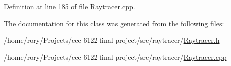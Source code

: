Definition at line 185 of file Raytracer.\+cpp.



The documentation for this class was generated from the following files\+:\begin{DoxyCompactItemize}
\item 
/home/rory/\+Projects/ece-\/6122-\/final-\/project/src/raytracer/\hyperlink{_raytracer_8h}{Raytracer.\+h}\item 
/home/rory/\+Projects/ece-\/6122-\/final-\/project/src/raytracer/\hyperlink{_raytracer_8cpp}{Raytracer.\+cpp}\end{DoxyCompactItemize}
